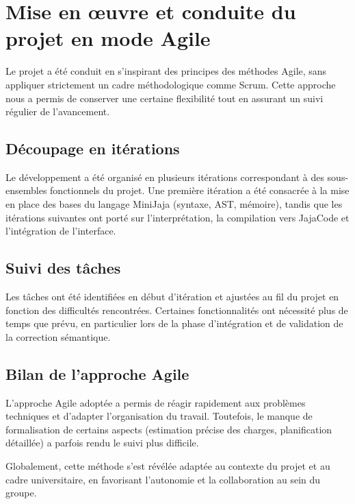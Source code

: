 
\section{Mise en \oe{}uvre et conduite du projet en mode Agile}

Le projet a été conduit en s’inspirant des principes des méthodes Agile, sans appliquer strictement un cadre méthodologique comme Scrum. Cette approche nous a permis de conserver une certaine flexibilité tout en assurant un suivi régulier de l’avancement.

\subsection{Découpage en itérations}

Le développement a été organisé en plusieurs itérations correspondant à des sous-ensembles fonctionnels du projet. Une première itération a été consacrée à la mise en place des bases du langage MiniJaja (syntaxe, AST, mémoire), tandis que les itérations suivantes ont porté sur l’interprétation, la compilation vers JajaCode et l’intégration de l’interface.


\subsection{Suivi des tâches}

Les tâches ont été identifiées en début d’itération et ajustées au fil du projet en fonction des difficultés rencontrées. Certaines fonctionnalités ont nécessité plus de temps que prévu, en particulier lors de la phase d’intégration et de validation de la correction sémantique.


\subsection{Bilan de l’approche Agile}

L’approche Agile adoptée a permis de réagir rapidement aux problèmes techniques et d’adapter l’organisation du travail. Toutefois, le manque de formalisation de certains aspects (estimation précise des charges, planification détaillée) a parfois rendu le suivi plus difficile.

Globalement, cette méthode s’est révélée adaptée au contexte du projet et au cadre universitaire, en favorisant l’autonomie et la collaboration au sein du groupe.

